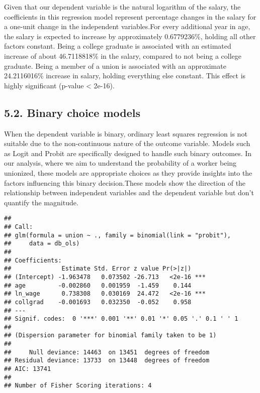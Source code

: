 \documentclass[
]{article}
\begin{document}
Given that our dependent variable is the natural logarithm of the
salary, the coefficients in this regression model represent percentage
changes in the salary for a one-unit change in the independent
variables.For every additional year in age, the salary is expected to
increase by approximately 0.6779236\%, holding all other factors
constant. Being a college graduate is associated with an estimated
increase of about 46.7118818\% in the salary, compared to not being a
college graduate. Being a member of a union is associated with an
approximate 24.2116016\% increase in salary, holding everything else
constant. This effect is highly significant (p-value \textless{} 2e-16).

\hypertarget{binary-choice-models}{%
\subsection{5.2. Binary choice models}\label{binary-choice-models}}

When the dependent variable is binary, ordinary least squares regression
is not suitable due to the non-continuous nature of the outcome
variable. Models such as Logit and Probit are specifically designed to
handle such binary outcomes. In our analysis, where we aim to understand
the probability of a worker being unionized, these models are
appropriate choices as they provide insights into the factors
influencing this binary decision.These models show the direction of the
relationship between independent variables and the dependent variable
but don't quantify the magnitude.

\begin{verbatim}
## 
## Call:
## glm(formula = union ~ ., family = binomial(link = "probit"), 
##     data = db_ols)
## 
## Coefficients:
##              Estimate Std. Error z value Pr(>|z|)    
## (Intercept) -1.963478   0.073502 -26.713   <2e-16 ***
## age         -0.002860   0.001959  -1.459    0.144    
## ln_wage      0.738308   0.030169  24.472   <2e-16 ***
## collgrad    -0.001693   0.032350  -0.052    0.958    
## ---
## Signif. codes:  0 '***' 0.001 '**' 0.01 '*' 0.05 '.' 0.1 ' ' 1
## 
## (Dispersion parameter for binomial family taken to be 1)
## 
##     Null deviance: 14463  on 13451  degrees of freedom
## Residual deviance: 13733  on 13448  degrees of freedom
## AIC: 13741
## 
## Number of Fisher Scoring iterations: 4
\end{verbatim}
\end{document}
